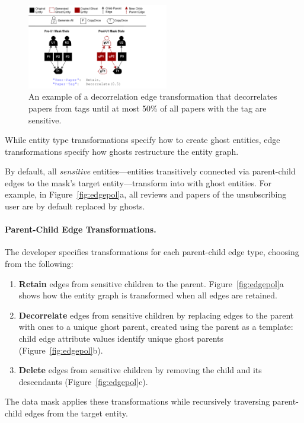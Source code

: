 \begin{figure}[t!]
    \centering
    \includegraphics[width=0.55\textwidth]{img/child-parent}

    \caption{An example of a decorrelation edge transformation that decorrelates papers from tags
    until at most 50\% of all papers with the tag are sensitive.
    }
    \label{fig:sensitivity}
\end{figure}

While entity type transformations specify how to create ghost entities, edge transformations 
specify how ghosts restructure the entity graph.

By default, all \emph{sensitive} entities---entities transitively connected via
parent-child edges to the mask's target entity---transform into with ghost entities.
For example, in Figure~\ref{fig:edgepol}a, all reviews and papers of the unsubscribing user are by
default replaced by ghosts.


\paragraph{Parent-Child Edge Transformations.}
The developer specifies transformations for each parent-child edge type, choosing from the following:
\begin{enumerate}
    \item \textbf{Retain} edges from sensitive children to the parent. Figure~\ref{fig:edgepol}a
        shows how the entity graph is transformed when all edges are retained.
    \item \textbf{Decorrelate} edges from sensitive children by replacing edges to the parent with
        ones to a unique ghost parent, created using the parent as a template:
        child edge attribute values identify unique ghost parents (Figure~\ref{fig:edgepol}b).
    \item \textbf{Delete} edges from sensitive children by removing the child and its descendants
        (Figure~\ref{fig:edgepol}c).
\end{enumerate}
The data mask applies these transformations while recursively traversing parent-child edges from the
target entity.

